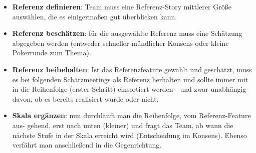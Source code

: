 \begin{itemize}
\begin{itemize}
        \begin{itemize}
          \item \textbf{Referenz definieren}: Team muss eine Referenz-Story mittlerer Größe
            auswählen, die es einigermaßen gut überblicken kann.
          \item \textbf{Referenz beschätzen}: für die ausgewählte Referenz muss eine Schätzung
            abgegeben werden (entweder schneller mündlicher Konsens oder kleine Pokerrunde zum
            Thema).
          \item \textbf{Referenz beibehalten}: Ist das Referenzfeature gewählt und geschätzt,
            muss es bei folgenden Schätzmeetings als Referenz herhalten und sollte immer mit in
            die Reihenfolge (erster Schritt) einsortiert werden - und zwar unabhängig davon, ob es
            bereits realisiert wurde oder nicht.
          \item \textbf{Skala ergänzen}: nun durchläuft man die Reihenfolge, vom Referenz-Feature aus-
            gehend, erst nach unten (kleiner) und fragt das Team, ab wann die nächste
            Stufe in der Skala erreicht wird (Entscheidung im Konsens). Ebenso verfährt man
            anschließend in die Gegenrichtung.
        \end{itemize}
    \end{itemize}
\end{itemize}


